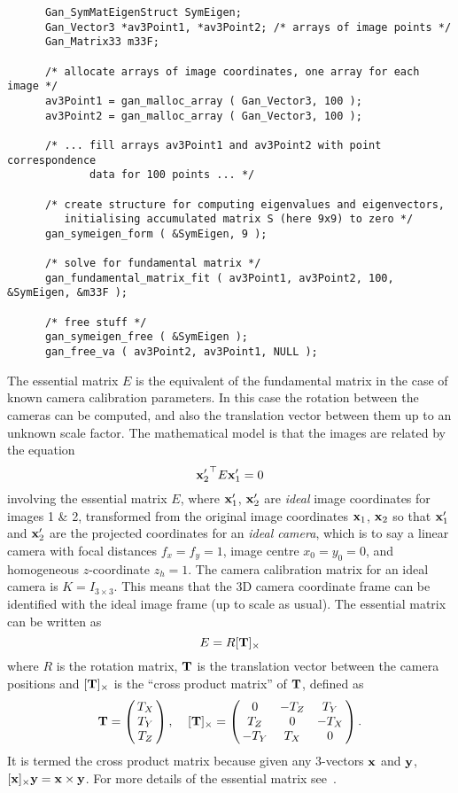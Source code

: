 \begin{verbatim}
      Gan_SymMatEigenStruct SymEigen;
      Gan_Vector3 *av3Point1, *av3Point2; /* arrays of image points */
      Gan_Matrix33 m33F;

      /* allocate arrays of image coordinates, one array for each image */
      av3Point1 = gan_malloc_array ( Gan_Vector3, 100 );
      av3Point2 = gan_malloc_array ( Gan_Vector3, 100 );

      /* ... fill arrays av3Point1 and av3Point2 with point correspondence
             data for 100 points ... */

      /* create structure for computing eigenvalues and eigenvectors,
         initialising accumulated matrix S (here 9x9) to zero */
      gan_symeigen_form ( &SymEigen, 9 );

      /* solve for fundamental matrix */
      gan_fundamental_matrix_fit ( av3Point1, av3Point2, 100, &SymEigen, &m33F );

      /* free stuff */
      gan_symeigen_free ( &SymEigen );
      gan_free_va ( av3Point2, av3Point1, NULL );
\end{verbatim}

The essential matrix $E$ is the equivalent of the fundamental matrix in the
case of known camera calibration parameters. In this case the rotation between
the cameras can be computed, and also the translation vector between them
up to an unknown scale factor. The mathematical model is that the images
are related by the equation
\[ {{\bf x}_2'}^{\top} E {\bf x}_1' = 0
\]
involving the essential matrix $E$, where ${\bf x}_1'$, ${\bf x}_2'$ are
{\em ideal} image coordinates for images 1 \& 2, transformed from the
original image coordinates ${\bf x}_1$, ${\bf x}_2$ so that ${\bf x}_1'$ and
${\bf x}_2'$ are the projected coordinates for an {\em ideal camera}, which
is to say a linear camera with focal distances $f_x=f_y=1$, image
centre $x_0=y_0=0$, and homogeneous $z$-coordinate $z_h=1$.
The camera calibration matrix for an ideal camera is $K=I_{3\times 3}$.
This means that the 3D camera coordinate frame can be identified with
the ideal image frame (up to scale as usual).
The essential matrix can be written as
\[ E = R[{\bf T}]_\times
\]
where $R$ is the rotation matrix, ${\bf T}$ is the translation vector
between the camera positions and $[{\bf T}]_\times$ is the ``cross product
matrix'' of ${\bf T}$, defined as
\[ \Tvec = \beginm{c} T_X \\ T_Y \\ T_Z \endm,\;\;\;\;
   [\Tvec]_\times = \beginm{ccc} 0 & -T_Z & T_Y \\ T_Z & 0 & -T_X \\
   -T_Y & T_X & 0 \endm.
\]
It is termed the cross product matrix because given any 3-vectors ${\bf x}$
and ${\bf y}$, $[{\bf x}]_\times {\bf y} = {\bf x} \times {\bf y}$.
For more details of the essential matrix see~\cite{Faugeras:93}.

